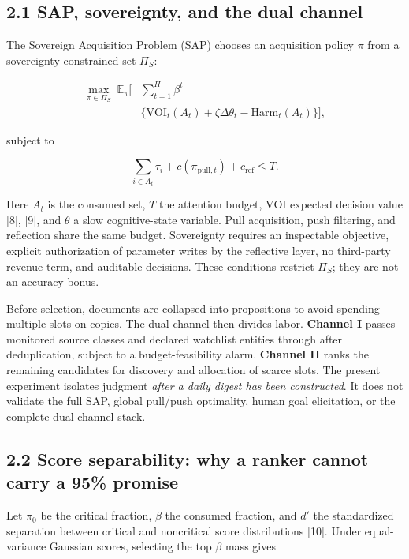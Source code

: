\documentclass[
  conference,10pt]{IEEEtran}
\begin{document}
\subsection{2.1 SAP, sovereignty, and the dual channel}\label{sap-sovereignty-and-the-dual-channel}

The Sovereign Acquisition Problem (SAP) chooses an acquisition policy \(\pi\) from a sovereignty-constrained set \(\Pi_S\):

\[
\begin{aligned}
\max_{\pi\in\Pi_S}\;\mathbb{E}_{\pi}\!\Bigg[&\sum_{t=1}^{H}\beta^t\\
&\{\mathrm{VOI}_t(A_t)+\zeta\Delta\theta_t-\mathrm{Harm}_t(A_t)\}\Bigg],
\end{aligned}
\]

subject to

\[
\sum_{i\in A_t}\tau_i+c(\pi_{\mathrm{pull},t})+c_{\mathrm{ref}}\le T .
\]

Here \(A_t\) is the consumed set, \(T\) the attention budget, \(\mathrm{VOI}\) expected decision value {[}8{]}, {[}9{]}, and \(\theta\) a slow cognitive-state variable. Pull acquisition, push filtering, and reflection share the same budget. Sovereignty requires an inspectable objective, explicit authorization of parameter writes by the reflective layer, no third-party revenue term, and auditable decisions. These conditions restrict \(\Pi_S\); they are not an accuracy bonus.

Before selection, documents are collapsed into propositions to avoid spending multiple slots on copies. The dual channel then divides labor. \textbf{Channel I} passes monitored source classes and declared watchlist entities through after deduplication, subject to a budget-feasibility alarm. \textbf{Channel II} ranks the remaining candidates for discovery and allocation of scarce slots. The present experiment isolates judgment \emph{after a daily digest has been constructed}. It does not validate the full SAP, global pull/push optimality, human goal elicitation, or the complete dual-channel stack.

\subsection{2.2 Score separability: why a ranker cannot carry a 95\% promise}\label{score-separability-why-a-ranker-cannot-carry-a-95-promise}

Let \(\pi_0\) be the critical fraction, \(\beta\) the consumed fraction, and \(d'\) the standardized separation between critical and noncritical score distributions {[}10{]}. Under equal-variance Gaussian scores, selecting the top \(\beta\) mass gives
\end{document}
